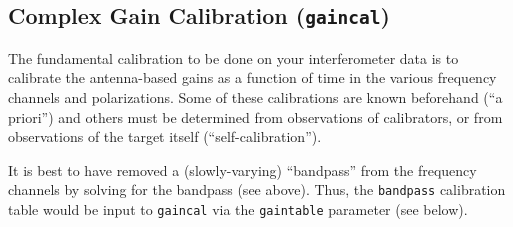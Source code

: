 \subsection{Complex Gain Calibration ({\tt gaincal})}
\label{section:cal.solve.gain}

The fundamental calibration to be done on your interferometer data
is to calibrate the antenna-based gains as a function of time in
the various frequency channels and polarizations.  Some of
these calibrations are known beforehand (``a priori'') and others
must be determined from observations of calibrators, or from observations
of the target itself (``self-calibration'').

It is best to have removed a (slowly-varying) ``bandpass'' from the
frequency channels by solving for the bandpass (see above).  Thus,
the {\tt bandpass} calibration table would be input to {\tt gaincal} via
the {\tt gaintable} parameter (see below).

